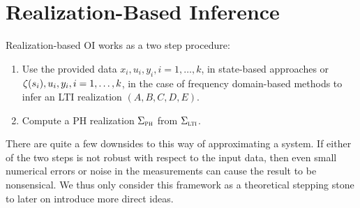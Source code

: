 \section{Realization-Based Inference}\label{sec:realization-based-inference}

Realization-based \ac{OI} works as a two step procedure:
\begin{enumerate}
    \item Use the provided data $x_i, u_i, y_i, i = 1, \dots, k$, in state-based approaches or $\zeta(s_i), u_i, y_i, i = 1, \dots, k$, in the case of frequency domain-based methods to infer an \ac{LTI} realization $(A, B, C, D, E)$.
    \item Compute a \ac{PH} realization $\Sigma_{\textnormal{\scshape ph}}$ from $\Sigma_{\textnormal{\scshape lti}}$.
\end{enumerate}
There are quite a few downsides to this way of approximating a system.
If either of the two steps is not robust with respect to the input data, then even small numerical errors or noise in the measurements can cause the result to be nonsensical.
We thus only consider this framework as a theoretical stepping stone to later on introduce more direct ideas.

